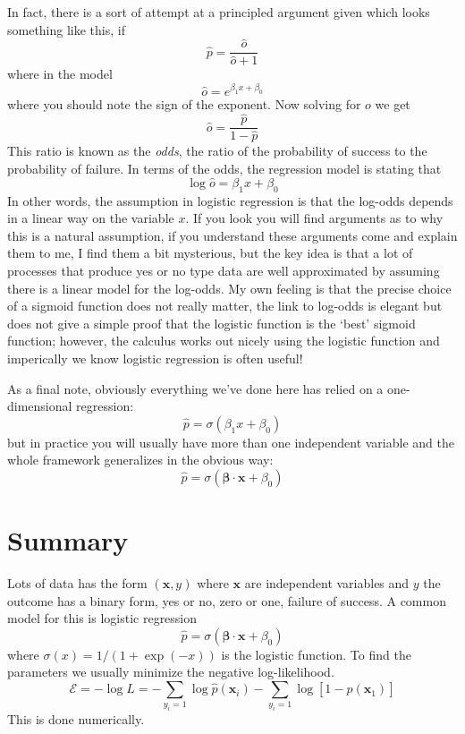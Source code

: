 \documentclass[12pt]{article}
\begin{document}
In fact, there is a sort of attempt at a principled argument given
which looks something like this, if
\begin{equation}
  \hat{p}=\frac{\hat{o}}{\hat{o}+1}
\end{equation}
where in the model
\begin{equation}
  \hat{o}=e^{\beta_1x+\beta_0}
\end{equation}
where you should note the sign of the exponent. Now solving for $o$ we get
\begin{equation}
  \hat{o}=\frac{\hat{p}}{1-\hat{p}}
\end{equation}
This ratio is known as the \textsl{odds}, the ratio of the probability
of success to the probability of failure. In terms of the odds, the
regression model is stating that
\begin{equation}
  \log\hat{o}=\beta_1x+\beta_0
\end{equation}
In other words, the assumption in logistic regression is that the
log-odds depends in a linear way on the variable $x$. If you look you
will find arguments as to why this is a natural assumption, if you
understand these arguments come and explain them to me, I find them a
bit mysterious, but the key idea is that a lot of processes that
produce yes or no type data are well approximated by assuming there is
a linear model for the log-odds. My own feeling is that the precise
choice of a sigmoid function does not really matter, the link to
log-odds is elegant but does not give a simple proof that the logistic
function is the `best' sigmoid function; however, the calculus works
out nicely using the logistic function and imperically we know
logistic regression is often useful!

As a final note, obviously everything we've done here has relied on a
one-dimensional regression:
\begin{equation}
  \hat{p}=\sigma(\beta_1x+\beta_0)
\end{equation}
but in practice you will usually have more than one independent
variable and the whole framework generalizes in the obvious way:
\begin{equation}
  \hat{p}=\sigma(\bm{\beta}\cdot \mathbf{x}+\beta_0)
\end{equation}


\section*{Summary}
Lots of data has the form $(\mathbf{x},y)$ where $\mathbf{x}$ are
independent variables and $y$ the outcome has a binary form, yes or
no, zero or one, failure of success. A common model for this is logistic regression
\begin{equation}
  \hat{p}=\sigma(\bm{\beta}\cdot \mathbf{x}+\beta_0)
\end{equation}
where $\sigma(x)=1/(1+\exp{(-x)})$ is the logistic function. To find the parameters we usually minimize the negative log-likelihood.
\begin{equation}
  \mathcal{E}=-\log{L}=-\sum_{y_i=1}\log\hat{p}(\mathbf{x}_i)-\sum_{y_i=1}\log[1-\hat{p}(\mathbf{x}_1)]
\end{equation}
This is done numerically.
\end{document}
